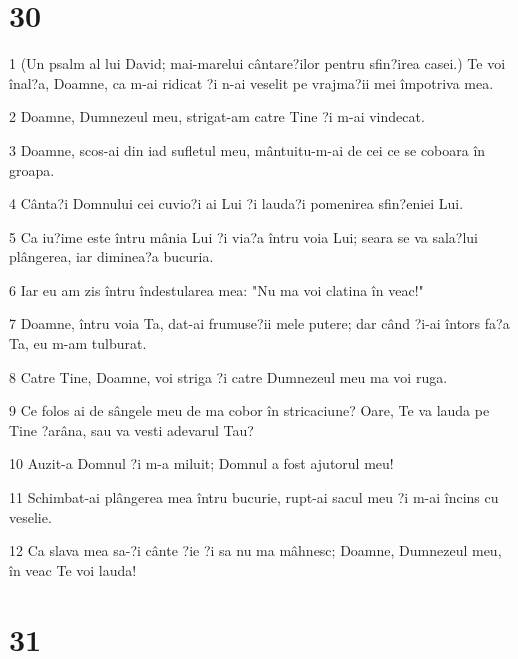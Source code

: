 \chapter{30}

\par 1 (Un psalm al lui David; mai-marelui cântare?ilor pentru sfin?irea casei.) Te voi înal?a, Doamne, ca m-ai ridicat ?i n-ai veselit pe vrajma?ii mei împotriva mea.
\par 2 Doamne, Dumnezeul meu, strigat-am catre Tine ?i m-ai vindecat.
\par 3 Doamne, scos-ai din iad sufletul meu, mântuitu-m-ai de cei ce se coboara în groapa.
\par 4 Cânta?i Domnului cei cuvio?i ai Lui ?i lauda?i pomenirea sfin?eniei Lui.
\par 5 Ca iu?ime este întru mânia Lui ?i via?a întru voia Lui; seara se va sala?lui plângerea, iar diminea?a bucuria.
\par 6 Iar eu am zis întru îndestularea mea: "Nu ma voi clatina în veac!"
\par 7 Doamne, întru voia Ta, dat-ai frumuse?ii mele putere; dar când ?i-ai întors fa?a Ta, eu m-am tulburat.
\par 8 Catre Tine, Doamne, voi striga ?i catre Dumnezeul meu ma voi ruga.
\par 9 Ce folos ai de sângele meu de ma cobor în stricaciune? Oare, Te va lauda pe Tine ?arâna, sau va vesti adevarul Tau?
\par 10 Auzit-a Domnul ?i m-a miluit; Domnul a fost ajutorul meu!
\par 11 Schimbat-ai plângerea mea întru bucurie, rupt-ai sacul meu ?i m-ai încins cu veselie.
\par 12 Ca slava mea sa-?i cânte ?ie ?i sa nu ma mâhnesc; Doamne, Dumnezeul meu, în veac Te voi lauda!

\chapter{31}

